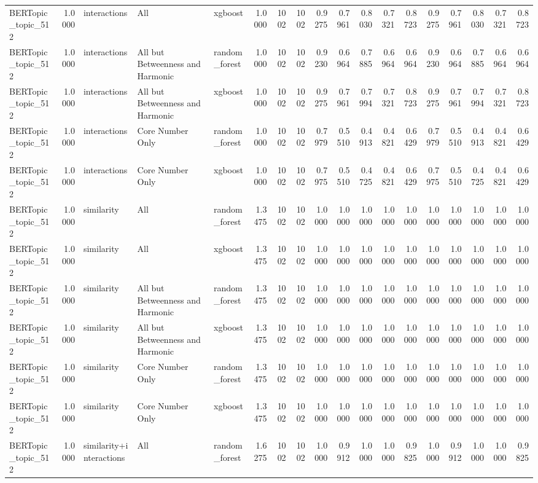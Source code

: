 \begin{tabular}{lrlllrrrrrrrrrrrrr}
BERTopic_topic_512 & 1.0000 & interactions & All & xgboost & 1.0000 & 1002 & 1002 & 0.9275 & 0.7961 & 0.8030 & 0.7321 & 0.8723 & 0.9275 & 0.7961 & 0.8030 & 0.7321 & 0.8723 \\
BERTopic_topic_512 & 1.0000 & interactions & All but Betweenness and Harmonic & random_forest & 1.0000 & 1002 & 1002 & 0.9230 & 0.6964 & 0.7885 & 0.6964 & 0.6964 & 0.9230 & 0.6964 & 0.7885 & 0.6964 & 0.6964 \\
BERTopic_topic_512 & 1.0000 & interactions & All but Betweenness and Harmonic & xgboost & 1.0000 & 1002 & 1002 & 0.9275 & 0.7961 & 0.7994 & 0.7321 & 0.8723 & 0.9275 & 0.7961 & 0.7994 & 0.7321 & 0.8723 \\
BERTopic_topic_512 & 1.0000 & interactions & Core Number Only & random_forest & 1.0000 & 1002 & 1002 & 0.7979 & 0.5510 & 0.4913 & 0.4821 & 0.6429 & 0.7979 & 0.5510 & 0.4913 & 0.4821 & 0.6429 \\
BERTopic_topic_512 & 1.0000 & interactions & Core Number Only & xgboost & 1.0000 & 1002 & 1002 & 0.7975 & 0.5510 & 0.4725 & 0.4821 & 0.6429 & 0.7975 & 0.5510 & 0.4725 & 0.4821 & 0.6429 \\
BERTopic_topic_512 & 1.0000 & similarity & All & random_forest & 1.3475 & 1002 & 1002 & 1.0000 & 1.0000 & 1.0000 & 1.0000 & 1.0000 & 1.0000 & 1.0000 & 1.0000 & 1.0000 & 1.0000 \\
BERTopic_topic_512 & 1.0000 & similarity & All & xgboost & 1.3475 & 1002 & 1002 & 1.0000 & 1.0000 & 1.0000 & 1.0000 & 1.0000 & 1.0000 & 1.0000 & 1.0000 & 1.0000 & 1.0000 \\
BERTopic_topic_512 & 1.0000 & similarity & All but Betweenness and Harmonic & random_forest & 1.3475 & 1002 & 1002 & 1.0000 & 1.0000 & 1.0000 & 1.0000 & 1.0000 & 1.0000 & 1.0000 & 1.0000 & 1.0000 & 1.0000 \\
BERTopic_topic_512 & 1.0000 & similarity & All but Betweenness and Harmonic & xgboost & 1.3475 & 1002 & 1002 & 1.0000 & 1.0000 & 1.0000 & 1.0000 & 1.0000 & 1.0000 & 1.0000 & 1.0000 & 1.0000 & 1.0000 \\
BERTopic_topic_512 & 1.0000 & similarity & Core Number Only & random_forest & 1.3475 & 1002 & 1002 & 1.0000 & 1.0000 & 1.0000 & 1.0000 & 1.0000 & 1.0000 & 1.0000 & 1.0000 & 1.0000 & 1.0000 \\
BERTopic_topic_512 & 1.0000 & similarity & Core Number Only & xgboost & 1.3475 & 1002 & 1002 & 1.0000 & 1.0000 & 1.0000 & 1.0000 & 1.0000 & 1.0000 & 1.0000 & 1.0000 & 1.0000 & 1.0000 \\
BERTopic_topic_512 & 1.0000 & similarity+interactions & All & random_forest & 1.6275 & 1002 & 1002 & 1.0000 & 0.9912 & 1.0000 & 1.0000 & 0.9825 & 1.0000 & 0.9912 & 1.0000 & 1.0000 & 0.9825 \\

\end{tabular}
